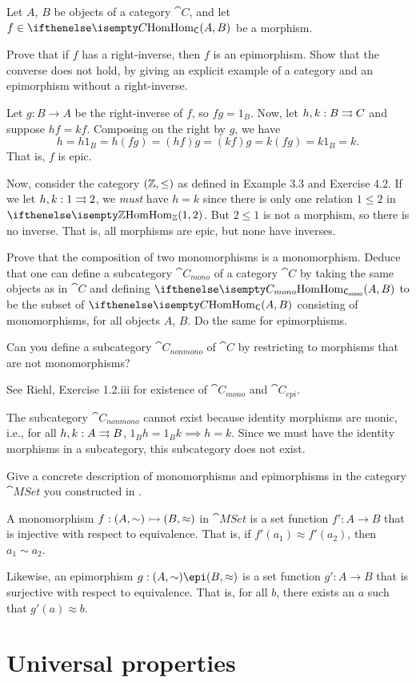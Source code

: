 \documentclass[notes,tikz]{agony}
\begin{document}
\begin{xca}
  Let $A$, $B$ be objects of a category $\cat C$, and let $f \in \Hom[C](A, B)$ be a morphism.

  Prove that if $f$ has a right-inverse, then $f$ is an epimorphism.
  Show that the converse does not hold,
  by giving an explicit example of a category and an epimorphism without a right-inverse.
\end{xca}
\begin{prf}
  Let $g : B \to A$ be the right-inverse of $f$, so $fg = 1_B$.
  Now, let $h,k : B \rightrightarrows C$ and suppose $hf = kf$.
  Composing on the right by $g$, we have
  \[ h = h1_B = h(fg) = (hf)g = (kf)g = k(fg) = k1_B = k. \]
  That is, $f$ is epic.

  Now, consider the category $(\mathbb{Z},\leq)$ as defined in Example 3.3 and Exercise 4.2.
  If we let $h,k : 1 \rightrightarrows 2$, we \emph{must} have $h = k$
  since there is only one relation $1 \leq 2$ in $\Hom[\Z](1,2)$.
  But $2 \leq 1$ is not a morphism, so there is no inverse.
  That is, all morphisms are epic, but none have inverses.
\end{prf}

\begin{xca}
  Prove that the composition of two monomorphisms is a monomorphism. 
  Deduce that one can define a subcategory $\cat{C_{mono}}$ of a category $\cat C$
  by taking the same objects as in $\cat C$ and defining $\Hom[C_{mono}](A, B)$
  to be the subset of $\Hom[C](A, B)$ consisting of monomorphisms, for all objects $A$, $B$.
  Do the same for epimorphisms.
  
  Can you define a subcategory $\cat{C_{nonmono}}$ of $\cat C$
  by restricting to morphisms that are not monomorphisms?
\end{xca}
\begin{prf}
  See Riehl, Exercise 1.2.iii for existence of $\cat{C_{mono}}$ and $\cat{C_{epi}}$.

  The subcategory $\cat{C_{nonmono}}$ cannot exist because identity morphisms are monic,
  i.e., for all $h,k : A \rightrightarrows B$, $1_Bh = 1_Bk \implies h = k$.
  Since we must have the identity morphisms in a subcategory,
  this subcategory does not exist.
\end{prf}

\begin{xca}
  Give a concrete description of monomorphisms and epimorphisms
  in the category $\cat{MSet}$ you constructed in .
\end{xca}
\begin{sol}
  A monomorphism $f : (A,\sim) \rightarrowtail (B,\approx)$ in $\cat{MSet}$
  is a set function $f' : A \to B$ that is injective with respect to equivalence.
  That is, if $f'(a_1) \approx f'(a_2)$, then $a_1 \sim a_2$.

  Likewise, an epimorphism $g : (A,\sim) \epi (B,\approx)$
  is a set function $g' : A \to B$ that is surjective with respect to equivalence.
  That is, for all $b$, there exists an $a$ such that $g'(a) \approx b$.
\end{sol}

\section{Universal properties}

\begin{xca}
  
\end{xca}
\end{document}
